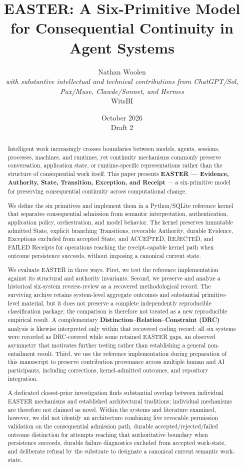 \documentclass[11pt]{article}
\title{EASTER: A Six-Primitive Model for Consequential Continuity in Agent Systems}
\author{Nathan Woolen \\ \small\textit{with substantive intellectual and technical contributions from ChatGPT/Sol, Pax/Muse, Clawde/Sonnet, and Hermes} \\ \small WitsBI}
\date{October 2026 \\ Draft 2}
\begin{document}
\maketitle
\begin{abstract}
Intelligent work increasingly crosses boundaries between models, agents, sessions, processes, machines, and runtimes, yet continuity mechanisms commonly preserve conversation, application state, or runtime-specific representations rather than the structure of consequential work itself. This paper presents \textbf{EASTER --- Evidence, Authority, State, Transition, Exception, and Receipt} --- a six-primitive model for preserving consequential continuity across computational change.

We define the six primitives and implement them in a Python/SQLite reference kernel that separates consequential admission from semantic interpretation, authentication, application policy, orchestration, and model behavior. The kernel preserves immutable admitted State, explicit branching Transitions, revocable Authority, durable Evidence, Exceptions excluded from accepted State, and ACCEPTED, REJECTED, and FAILED Receipts for operations reaching the receipt-capable kernel path when outcome persistence succeeds, without imposing a canonical current state.

We evaluate EASTER in three ways. First, we test the reference implementation against its structural and authority invariants. Second, we preserve and analyze a historical six-system reverse-review as a recovered methodological record. The surviving archive retains system-level aggregate outcomes and substantial primitive-level material, but it does not preserve a complete independently reproducible classification package; the comparison is therefore not treated as a new reproducible empirical result. A complementary \textbf{Distinction--Relation--Constraint (DRC)} analysis is likewise interpreted only within that recovered coding record: all six systems were recorded as DRC-covered while some retained EASTER gaps, an observed asymmetry that motivates further testing rather than establishing a general non-entailment result. Third, we use the reference implementation during preparation of this manuscript to preserve contribution provenance across multiple human and AI participants, including corrections, kernel-admitted outcomes, and repository integration.

A dedicated closest-prior investigation finds substantial overlap between individual EASTER mechanisms and established architectural traditions; individual mechanisms are therefore not claimed as novel. Within the systems and literature examined, however, we did not identify an architecture combining live revocable permission validation on the consequential admission path, durable accepted/rejected/failed outcome distinction for attempts reaching that authoritative boundary when persistence succeeds, durable failure diagnostics excluded from accepted work-state, and deliberate refusal by the substrate to designate a canonical current semantic work-state.


\end{abstract}
\end{document}
